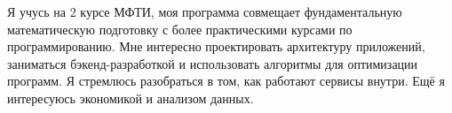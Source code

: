 Я учусь на 2 курсе МФТИ, моя программа совмещает фундаментальную математическую подготовку с более практическими курсами по программированию.
Мне интересно проектировать архитектуру приложений, заниматься бэкенд-разработкой и использовать алгоритмы для оптимизации программ.
Я стремлюсь разобраться в том, как работают сервисы внутри. 
Ещё я интересуюсь экономикой и анализом данных.
